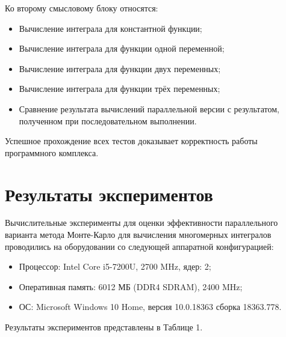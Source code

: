 \documentclass{report}
\begin{document}
\par Ко второму смысловому блоку относятся:
\begin{itemize}
\item Вычисление интеграла для константной функции;
\item Вычисление интеграла для функции одной переменной;
\item Вычисление интеграла для функции двух переменных;
\item Вычисление интеграла для функции трёх переменных;
\item Сравнение результата вычислений параллельной версии с результатом, полученном при последовательном выполнении.
\end{itemize}

\par Успешное прохождение всех тестов доказывает корректность работы программного комплекса.

\newpage


\section*{Результаты экспериментов}
\indent\par Вычислительные эксперименты для оценки эффективности параллельного варианта метода Монте-Карло для вычисления многомерных интегралов проводились на оборудовании со следующей аппаратной конфигурацией:

\begin{itemize}
\item Процессор: Intel Core i5-7200U, 2700 MHz, ядер: 2;
\item Оперативная память: 6012 МБ (DDR4 SDRAM), 2400 MHz;
\item ОС: Microsoft Windows 10 Home, версия 10.0.18363 сборка 18363.778.
\end{itemize}

\par Результаты экспериментов представлены в Таблице 1.
\end{document}
